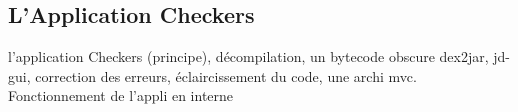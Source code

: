 
\subsection{L'Application Checkers}

l'application Checkers (principe), décompilation, un bytecode obscure
dex2jar, jd-gui, correction des erreurs, éclaircissement du code, une archi mvc.
Fonctionnement de l'appli en interne
